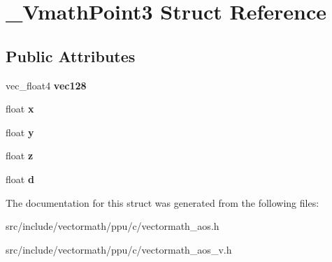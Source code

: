 \hypertarget{struct__VmathPoint3}{\section{\-\_\-\-Vmath\-Point3 Struct Reference}
\label{struct__VmathPoint3}
}
\subsection*{Public Attributes}
\begin{DoxyCompactItemize}
\item 
\hypertarget{struct__VmathPoint3_ab923b3c4fd0d8d3fcee7f61236d4f2d7}{vec\-\_\-float4 {\bfseries vec128}}\label{struct__VmathPoint3_ab923b3c4fd0d8d3fcee7f61236d4f2d7}

\item 
\hypertarget{struct__VmathPoint3_afcd83019622475475346c011efdaee42}{float {\bfseries x}}\label{struct__VmathPoint3_afcd83019622475475346c011efdaee42}

\item 
\hypertarget{struct__VmathPoint3_a69e23d25f5f4b69534b9330dc2a36f71}{float {\bfseries y}}\label{struct__VmathPoint3_a69e23d25f5f4b69534b9330dc2a36f71}

\item 
\hypertarget{struct__VmathPoint3_ac0cd29bab6eeb0c3f2aca4885c64192f}{float {\bfseries z}}\label{struct__VmathPoint3_ac0cd29bab6eeb0c3f2aca4885c64192f}

\item 
\hypertarget{struct__VmathPoint3_af7e61a90f75ecf52f78e16e97a81aea7}{float {\bfseries d}}\label{struct__VmathPoint3_af7e61a90f75ecf52f78e16e97a81aea7}

\end{DoxyCompactItemize}


The documentation for this struct was generated from the following files\-:\begin{DoxyCompactItemize}
\item 
src/include/vectormath/ppu/c/vectormath\-\_\-aos.\-h\item 
src/include/vectormath/ppu/c/vectormath\-\_\-aos\-\_\-v.\-h\end{DoxyCompactItemize}
